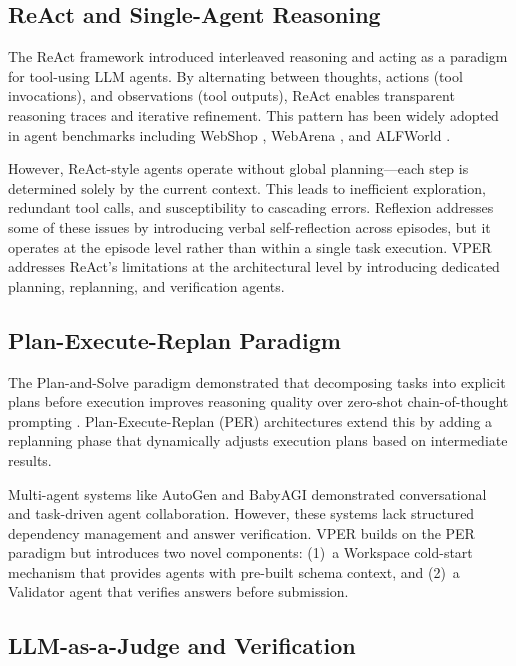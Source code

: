 \documentclass{article}
\begin{document}
\subsection{ReAct and Single-Agent Reasoning}

The ReAct framework \cite{yao2022react} introduced interleaved reasoning and acting as a paradigm for tool-using LLM agents.
By alternating between thoughts, actions (tool invocations), and observations (tool outputs), ReAct enables transparent reasoning traces and iterative refinement.
This pattern has been widely adopted in agent benchmarks including WebShop \cite{yao2022webshop}, WebArena \cite{zhou2023webarena}, and ALFWorld \cite{shridharalfworld}.

However, ReAct-style agents operate without global planning---each step is determined solely by the current context.
This leads to inefficient exploration, redundant tool calls, and susceptibility to cascading errors.
Reflexion \cite{shinn2023reflexion} addresses some of these issues by introducing verbal self-reflection across episodes, but it operates at the episode level rather than within a single task execution.
VPER addresses ReAct's limitations at the architectural level by introducing dedicated planning, replanning, and verification agents.

\subsection{Plan-Execute-Replan Paradigm}

The Plan-and-Solve paradigm \cite{plansolve2024} demonstrated that decomposing tasks into explicit plans before execution improves reasoning quality over zero-shot chain-of-thought prompting \cite{wei2022chain}.
Plan-Execute-Replan (PER) architectures extend this by adding a replanning phase that dynamically adjusts execution plans based on intermediate results.

Multi-agent systems like AutoGen \cite{wu2023autogen} and BabyAGI \cite{babyagi2023} demonstrated conversational and task-driven agent collaboration.
However, these systems lack structured dependency management and answer verification.
VPER builds on the PER paradigm but introduces two novel components: (1)~a Workspace cold-start mechanism that provides agents with pre-built schema context, and (2)~a Validator agent that verifies answers before submission.

\subsection{LLM-as-a-Judge and Verification}
\end{document}
